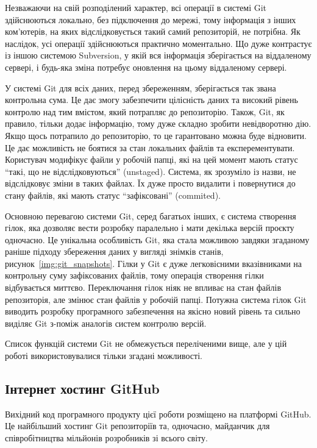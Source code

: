 Незважаючи на свій розподілений характер, всі операції в системі Git здійснюються локально,
без підключення до мережі, тому інформація з інших ком'ютерів, на яких відслідковується
такий самий репозиторій, не потрібна. Як наслідок, усі операції здійснюються практично
моментально. Що дуже контрастує із іншою системою Subversion, у якій вся інформація
зберігається на віддаленому сервері, і будь-яка зміна потребує оновлення на цьому
віддаленому сервері.

У системі Git для всіх даних, перед збереженням, зберігається так звана контрольна сума.
Це дає змогу забезпечити цілісність даних та високий рівень контролю над тим
вмістом, який потрапляє до репозиторію. Також, Git, як правило, тільки додає
інформацію, тому дуже складно зробити невідворотню дію. Якщо щось потрапило до
репозиторію, то це гарантовано можна буде відновити. Це дає можливість не боятися
за стан локальних файлів та експерементувати. Користувач модифікує файли у робочій папці,
які на цей момент мають статус ``такі, що не відслідковуються'' (unstaged). Система,
як зрозуміло із назви, не відслідковує зміни в таких файлах. Їх дуже просто видалити
і повернутися до стану файлів, які мають статус ``зафіксовані'' (commited).

Основною перевагою системи Git, серед багатьох інших, є система створення гілок, яка
дозволяє вести розробку паралельно і мати декілька версій проєкту одночасно. Це унікальна
особливість Git, яка стала можливою завдяки згаданому раніше підходу збереження даних
у вигляді знімків станів, рисунок~\ref{img:git_snapshots}. Гілки у Git є дуже легковісними
вказівниками на контрольну суму зафіксованих файлів, тому операція створення гілки
відбувається миттєво. Переключання гілок ніяк не впливає на стан файлів репозиторія,
але змінює стан файлів у робочій папці. Потужна система гілок Git виводить розробку
програмного забезпечення на якісно новий рівень та сильно виділяє Git з-поміж аналогів
систем контролю версій.

Список функцій системи Git не обмежується переліченими вище, але у цій роботі 
використовувалися тільки згадані можливості.

\subsection{Інтернет хостинг GitHub}
Вихідний код програмного продукту цієї роботи розміщено на платформі GitHub.
Це найбільший хостинг Git репозиторіїв та, одночасно, майданчик для співробітництва
мільйонів розробників зі всього світу.

